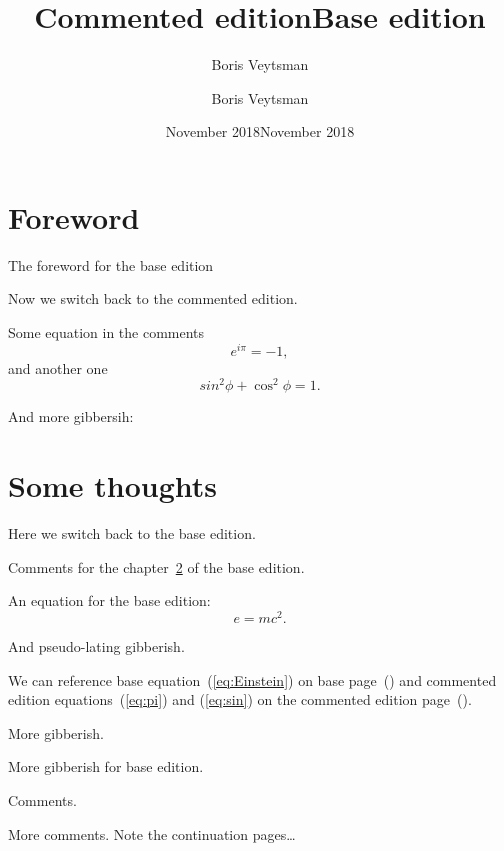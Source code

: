 \documentclass{book}
\title{Commented edition}
\author{Boris Veytsman}
\date{November 2018}
\begin{document}
\frontmatter
\title{Base edition}
\author{Boris Veytsman}
\date{November 2018}
\maketitle

\chapter{Foreword}
\label{chap:foreword}

The foreword for the base edition

\lipsum[1-5]

\begin{commeditText}

  Now we switch back to the commented edition.
  
  Some equation in the comments
  \begin{equation}
    \label{eq:pi}
    e^{i\pi}=-1,
  \end{equation}
  and another one
  \begin{equation}
    \label{eq:sin}
    sin^2\phi+\cos^2\phi=1.
  \end{equation}

  And more gibbersih:

  \kant[5-12]
  
\end{commeditText}

\mainmatter

\chapter{Some thoughts}
\label{chap:thoughts}

Here we switch back to the base edition.  
\begin{commeditComments}
  Comments for the chapter~\ref{chap:thoughts} of the base edition. 
  \kant[6]
\end{commeditComments}

An equation for the base edition:
\begin{equation}
  \label{eq:Einstein}
  e=mc^2.
\end{equation}

And pseudo-lating gibberish.

\lipsum[6-12]


\begin{commeditComments}
  We can reference base equation~(\ref{eq:Einstein}) on base
  page~(\pageref{eq:Einstein}) and commented edition
  equations~(\ref{eq:pi}) and (\ref{eq:sin}) on the commented edition
  page~(\pageref{eq:pi}).

  More gibberish.
  
  \kant[7]
\end{commeditComments}

More gibberish for base edition.

\lipsum[15-17]

\begin{commeditComments}
  Comments.
  \kant[4]
\end{commeditComments}

\lipsum[3-2]

\begin{commeditComments}
  More comments.  Note the continuation pages\ldots
  \kant[8-20]
\end{commeditComments}

\lipsum[9-20]
\end{document}
